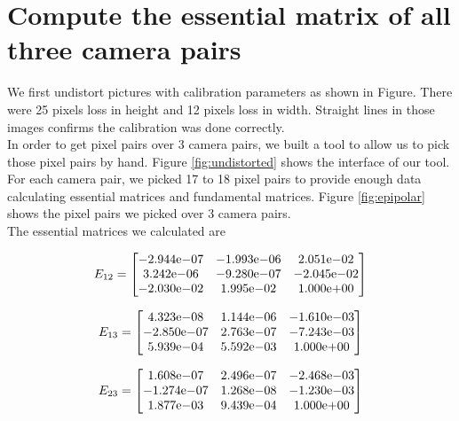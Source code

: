 \documentclass[10pt,twocolumn,letterpaper]{article}
\begin{document}
\section{Compute the essential matrix of all three camera pairs}

We first undistort pictures with calibration parameters as shown in Figure. There were 25 pixels loss in height and 12 pixels loss in width. Straight lines in those images confirms the calibration was done correctly.\\

In order to get pixel pairs over 3 camera pairs, we built a tool to allow us to pick those pixel pairs by hand. Figure \ref{fig:undistorted} shows the interface of our tool.\\

For each camera pair, we picked 17 to 18 pixel pairs to provide enough data calculating essential matrices and fundamental matrices. Figure \ref{fig:epipolar} shows the pixel pairs we picked over 3 camera pairs.\\

The essential matrices we calculated are

$$E_{12} =
\begin{bmatrix}
-2.944{\text e-}07&-1.993{\text e-}06&2.051{\text e-}02\\
3.242{\text e-}06&-9.280{\text e-}07&-2.045{\text e-}02\\
-2.030{\text e-}02&1.995{\text e-}02&1.000{\text e+}00 
\end{bmatrix}
$$

$$E_{13} =
\begin{bmatrix}
4.323{\text e-}08&1.144{\text e-}06&-1.610{\text e-}03\\
-2.850{\text e-}07&2.763{\text e-}07&-7.243{\text e-}03\\
5.939{\text e-}04&5.592{\text e-}03&1.000{\text e+}00
\end{bmatrix}
$$

$$E_{23} =
\begin{bmatrix}
1.608{\text e-}07&2.496{\text e-}07&-2.468{\text e-}03\\
-1.274{\text e-}07&1.268{\text e-}08&-1.230{\text e-}03\\
1.877{\text e-}03&9.439{\text e-}04&1.000{\text e+}00
\end{bmatrix}
$$
\end{document}

